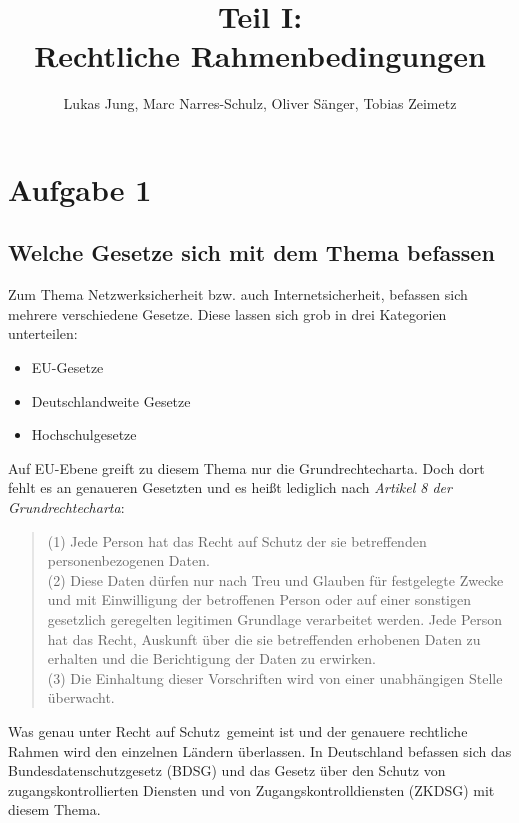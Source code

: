 \documentclass[10pt,a4paper]{article}
\author{Lukas Jung, Marc Narres-Schulz, Oliver Sänger, Tobias Zeimetz}
\title{Teil I: \\Rechtliche Rahmenbedingungen}
\begin{document}
\maketitle
\newpage

\section*{Aufgabe 1}
\subsection*{Welche Gesetze sich mit dem Thema befassen}
Zum Thema Netzwerksicherheit bzw. auch Internetsicherheit, befassen sich mehrere verschiedene Gesetze. Diese lassen sich grob in drei Kategorien unterteilen:
\begin{itemize}
	\item EU-Gesetze
	\item Deutschlandweite Gesetze
	\item Hochschulgesetze
\end{itemize}
Auf EU-Ebene greift zu diesem Thema nur die Grundrechtecharta. Doch dort fehlt es an genaueren Gesetzten und es heißt lediglich nach \emph{Artikel 8 der Grundrechtecharta}:
\begin{quote}
(1) Jede Person hat das Recht auf Schutz der sie betreffenden personenbezogenen Daten.\\
(2) Diese Daten dürfen nur nach Treu und Glauben für festgelegte Zwecke und mit Einwilligung
der betroffenen Person oder auf einer sonstigen gesetzlich geregelten legitimen Grundlage verarbeitet
werden. Jede Person hat das Recht, Auskunft über die sie betreffenden erhobenen Daten zu erhalten
und die Berichtigung der Daten zu erwirken.\\
(3) Die Einhaltung dieser Vorschriften wird von einer unabhängigen Stelle überwacht.
\end{quote} 
Was genau unter \glqq Recht auf Schutz\grqq \ gemeint ist und der genauere rechtliche Rahmen wird den einzelnen Ländern überlassen. In Deutschland befassen sich das Bundesdatenschutzgesetz (BDSG) und das Gesetz über den Schutz von zugangskontrollierten Diensten und von Zugangskontrolldiensten (ZKDSG) mit diesem Thema. 
\end{document}
